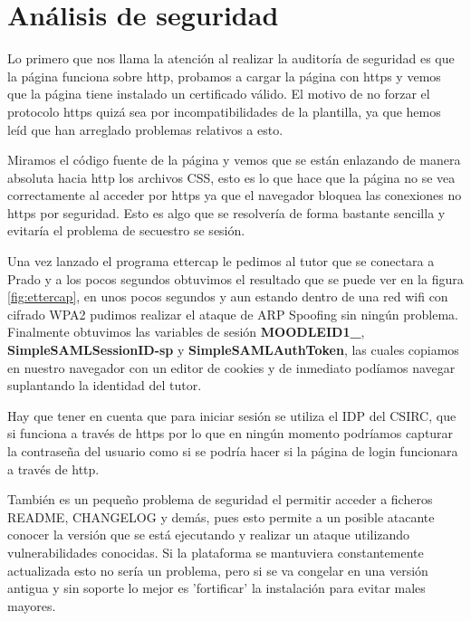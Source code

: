 \section{Análisis de seguridad}

Lo primero que nos llama la atención al realizar la auditoría de seguridad es que la página funciona sobre http, probamos a cargar la página con https y vemos que la página tiene instalado un certificado válido. El motivo de no forzar el protocolo https quizá sea por incompatibilidades de la plantilla, ya que hemos leíd que han arreglado problemas relativos a esto\cite{art_11}. 

\bigskip
Miramos el código fuente de la página y vemos que se están enlazando de manera absoluta hacia http los archivos CSS, esto es lo que hace que la página no se vea correctamente al acceder por https ya que el navegador bloquea las conexiones no https por seguridad. Esto es algo que se resolvería de forma bastante sencilla y evitaría el problema de secuestro se sesión.

\bigskip
Una vez lanzado el programa ettercap le pedimos al tutor que se conectara a Prado y a los pocos segundos obtuvimos el resultado que se puede ver en la figura \ref{fig:ettercap}, en unos pocos segundos y aun estando dentro de una red wifi con cifrado WPA2 pudimos realizar el ataque de ARP Spoofing sin ningún problema. Finalmente obtuvimos las variables de sesión \textbf{MOODLEID1\_}, \textbf{SimpleSAMLSessionID-sp} y \textbf{SimpleSAMLAuthToken}, las cuales copiamos en nuestro navegador con un editor de cookies y de inmediato podíamos navegar suplantando la identidad del tutor.

\bigskip 
Hay que tener en cuenta que para iniciar sesión se utiliza el IDP del CSIRC, que si funciona a través de https por lo que en ningún momento podríamos capturar la contraseña del usuario como si se podría hacer si la página de login funcionara a través de http.

\bigskip
También es un pequeño problema de seguridad el permitir acceder a ficheros README, CHANGELOG y demás, pues esto permite a un posible atacante conocer la versión que se está ejecutando y realizar un ataque utilizando vulnerabilidades conocidas. Si la plataforma se mantuviera constantemente actualizada esto no sería un problema, pero si se va congelar en una versión antigua y sin soporte lo mejor es 'fortificar' la instalación para evitar males mayores.

